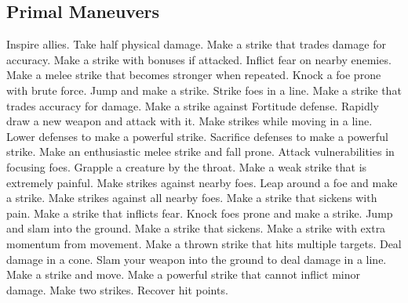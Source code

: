 \small
\subsection{Primal Maneuvers}\label{Primal Maneuvers}
\begin{spelllist}
 Inspire allies.
 Take half physical damage.
 Make a strike that trades damage for accuracy.
 Make a strike with bonuses if attacked.
 Inflict fear on nearby enemies.
 Make a melee strike that becomes stronger when repeated.
 Knock a foe prone with brute force.
 Jump and make a strike.
 Strike foes in a line.
 Make a strike that trades accuracy for damage.
 Make a strike against Fortitude defense.
 Rapidly draw a new weapon and attack with it.
 Make strikes while moving in a line.
 Lower defenses to make a powerful strike.
 Sacrifice defenses to make a powerful strike.
 Make an enthusiastic melee strike and fall prone.
 Attack vulnerabilities in focusing foes.
 Grapple a creature by the throat.
 Make a weak strike that is extremely painful.
 Make strikes against nearby foes.
 Leap around a foe and make a strike.
 Make strikes against all nearby foes.
 Make a strike that sickens with pain.
 Make a strike that inflicts fear.
 Knock foes prone and make a strike.
 Jump and slam into the ground.
 Make a strike that sickens.
 Make a strike with extra momentum from movement.
 Make a thrown strike that hits multiple targets.
 Deal damage in a cone.
 Slam your weapon into the ground to deal damage in a line.
 Make a strike and move.
 Make a powerful strike that cannot inflict minor damage.
 Make two strikes.
 Recover hit points.
\end{spelllist}




